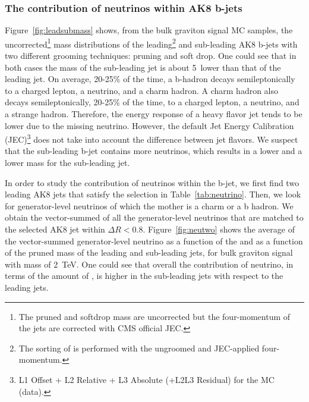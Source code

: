 \subsubsection*{The contribution of neutrinos within AK8 b-jets \label{sec:neutrino}}

Figure~\ref{fig:leadsubmass} shows, from the bulk graviton signal MC samples, 
the uncorrected\footnote{The pruned and softdrop mass are uncorrected 
but the four-momentum of the jets are corrected with CMS official JEC.}
 mass distributions of the leading\footnote{The sorting of \pt 
is performed with the ungroomed and JEC-applied four-momentum.} and 
sub-leading AK8 b-jets with two different grooming techniques: pruning and 
soft drop. One could see that in both cases the mass of the sub-leading jet 
is about 5~\GeV lower than that of the leading jet. On average, 20-25\% of 
the time, a b-hadron decays semileptonically to a charged lepton, a neutrino, 
and a charm hadron. 
A charm hadron also decays semileptonically, 20-25\% of the time, to a charged 
lepton, a neutrino, and a strange hadron. Therefore, the energy response of a 
heavy flavor jet 
tends to be lower due to the missing neutrino. However, the default Jet Energy 
Calibration (JEC)\footnote{L1 Offset + L2 Relative + L3 Absolute (+L2L3 
Residual) for the MC (data).} does not take into account the difference 
between jet flavors. 
We suspect that the sub-leading b-jet contains more neutrinos, which 
results in a lower \pt and a lower mass for the sub-leading jet. 

In order to study the contribution of neutrinos within the b-jet, we 
first find two leading AK8 jets that satisfy the selection in 
Table~\ref{tab:neutrino}. Then, we look for generator-level neutrinos 
of which the mother is a charm or a b hadron. We obtain the vector-summed 
\pt of all the generator-level neutrinos that are matched to the selected 
AK8 jet within $\Delta R < 0.8$. 
Figure~\ref{fig:neutwo} shows the average of the 
vector-summed generator-level neutrino \pt as a function of the \pt and as a 
function of the pruned mass of the leading and sub-leading jets, for bulk 
graviton signal with mass of 2~TeV. 
One could see that overall the contribution of neutrino, in terms of the 
amount of \pt, is higher in the sub-leading jets with respect to the 
leading jets.

